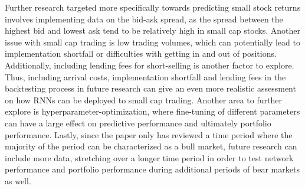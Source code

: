 \indent\newline 
Further research targeted more specifically towards predicting small stock returns involves implementing data on the bid-ask spread, as the spread between the highest bid and lowest ask tend to be relatively high in small cap stocks. Another issue with small cap trading is low trading volumes, which can potentially lead to implementation shortfall or difficulties with getting in and out of positions. Additionally, including lending fees for short-selling is another factor to explore. Thus, including arrival costs, implementation shortfall and lending fees in the backtesting process in future research can give an even more realistic assessment on how RNNs can be deployed to small cap trading. Another area to further explore is hyperparameter-optimization, where fine-tuning of different parameters can have a large effect on predictive performance and ultimately portfolio performance. Lastly, since the paper only has reviewed a time period where the majority of the period can be characterized as a bull market, future research can include more data, stretching over a longer time period in order to test network performance and portfolio performance during additional periods of bear markets as well. 